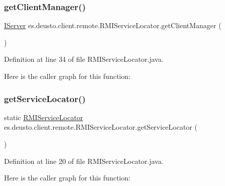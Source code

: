 \subsubsection{\texorpdfstring{getClientManager()}{getClientManager()}}
{\footnotesize\ttfamily \mbox{\hyperlink{interfacees_1_1deusto_1_1server_1_1_i_server}{I\+Server}} es.\+deusto.\+client.\+remote.\+R\+M\+I\+Service\+Locator.\+get\+Client\+Manager (\begin{DoxyParamCaption}{ }\end{DoxyParamCaption})}



Definition at line 34 of file R\+M\+I\+Service\+Locator.\+java.

Here is the caller graph for this function\+:
\mbox{\label{classes_1_1deusto_1_1client_1_1remote_1_1_r_m_i_service_locator_a8054c4752675c3d8703a0ba79fb1c2c0}} 
\subsubsection{\texorpdfstring{getServiceLocator()}{getServiceLocator()}}
{\footnotesize\ttfamily static \mbox{\hyperlink{classes_1_1deusto_1_1client_1_1remote_1_1_r_m_i_service_locator}{R\+M\+I\+Service\+Locator}} es.\+deusto.\+client.\+remote.\+R\+M\+I\+Service\+Locator.\+get\+Service\+Locator (\begin{DoxyParamCaption}{ }\end{DoxyParamCaption})\hspace{0.3cm}{\ttfamily [static]}}



Definition at line 20 of file R\+M\+I\+Service\+Locator.\+java.

Here is the caller graph for this function\+:
\mbox{\label{classes_1_1deusto_1_1client_1_1remote_1_1_r_m_i_service_locator_a336e3b578829c4f0e99e66af6955640a}} 
